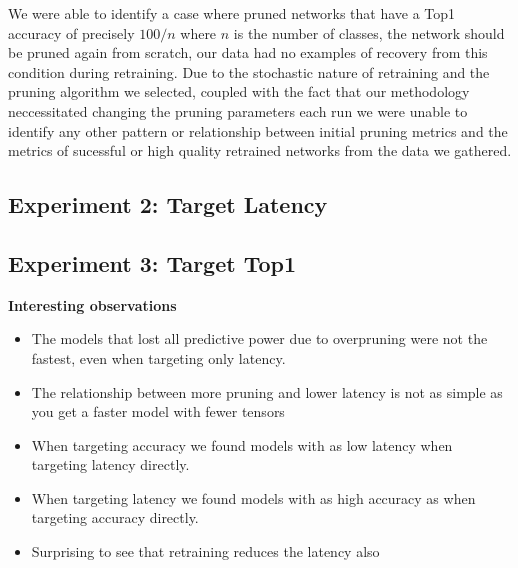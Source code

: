 \documentclass[../Dissertation.tex]{subfiles}
\begin{document}
We were able to identify a case where pruned networks that have a Top1 accuracy of precisely $100 / n$ where $n$ is the number of classes, the network should be pruned again from scratch, our data had no examples of recovery from this condition during retraining.
Due to the stochastic nature of retraining and the pruning algorithm we selected, coupled with the fact that our methodology neccessitated changing the pruning parameters each run we were unable to identify any other pattern or relationship between initial pruning metrics and the metrics of sucessful or high quality retrained networks from the data we gathered. 



\subsection{Experiment 2: Target Latency}

\subsection{Experiment 3: Target Top1}

\textbf{Interesting observations}
\begin{itemize}
    \item The models that lost all predictive power due to overpruning were not the fastest, even when targeting only latency.
    \item The relationship between more pruning and lower latency is not as simple as you get a faster model with fewer tensors
    \item When targeting accuracy we found models with as low latency when targeting latency directly.
    \item When targeting latency we found models with as high accuracy as when targeting accuracy directly.
    \item Surprising to see that retraining reduces the latency also
\end{itemize}
\end{document}
